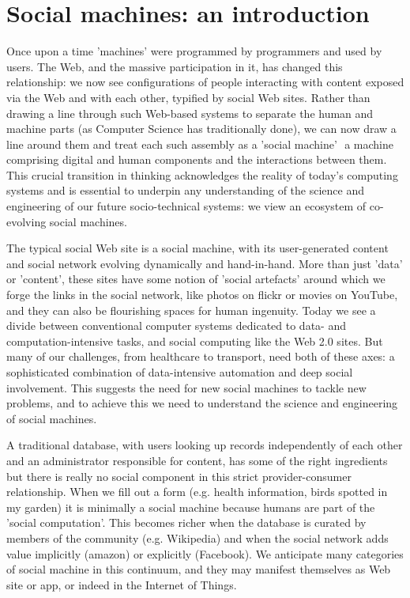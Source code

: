 \documentclass{sig-alternate}
\begin{document}
\section{Social machines: an introduction}
Once upon a time 'machines' were programmed by programmers and used by users. The Web, and the
massive participation in it, has changed this relationship: we now see configurations of people interacting with content exposed via the Web and with each other, typified by social Web sites. Rather than drawing a line through such Web-based systems to separate the human and machine parts (as Computer Science has traditionally done), we can now draw a line around them  and  treat  each  such  assembly  as  a  'social  machine'    a  machine  comprising  digital  and  human
components and the interactions between them. This crucial transition in thinking acknowledges the reality of today's computing systems and is essential to underpin any understanding of the science and engineering of our future socio-technical systems: we view an ecosystem of co-evolving social machines.

The  typical  social Web  site  is  a  social machine, with  its user-generated  content  and  social network evolving dynamically  and  hand-in-hand. More  than  just  'data' or  'content',  these sites have  some notion of  'social artefacts' around which we forge the links in the social network, like photos on flickr or movies on YouTube, and they  can also be  flourishing  spaces  for human  ingenuity.  
Today we  see  a  divide  between  conventional  computer  systems  dedicated  to  data-  and  computation-intensive tasks, and social computing like the Web 2.0 sites. But many of our challenges, from healthcare to transport, need  both  of  these  axes:  a  sophisticated  combination  of  data-intensive  automation  and  deep  social involvement. This suggests the need for new social machines to tackle new problems, and to achieve this we
need to understand the science and engineering of social machines. 

A  traditional  database,  with  users  looking  up  records  independently  of  each  other  and  an  administrator responsible for content, has some of the right ingredients but there is really no social component in this strict provider-consumer relationship. When we fill out a form (e.g. health information, birds spotted in my garden) it  is minimally  a  social machine  because humans  are  part  of  the  'social  computation'.  This  becomes  richer when  the database  is  curated by members  of  the  community  (e.g. Wikipedia) and when  the  social network adds value implicitly (amazon) or explicitly (Facebook). We anticipate many categories of social machine in this continuum, and they may manifest themselves as Web site or app, or indeed in the Internet of Things.
\end{document}
